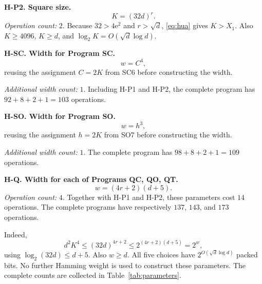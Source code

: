 \documentclass[11pt]{article}
\theoremstyle{remark}
\begin{document}
\textbf{H-P2. Square size.}
\[
  K=(32d)^r.
\]
\emph{Operation count:} $2$.
Because $32>4\mathrm e^2$ and $r>\sqrt d$,
\eqref{eq:hua} gives $K>X_1$.
Also $K\ge4096$, $K\ge d$, and $\log_2K=O(\sqrt d\log d)$.

\textbf{H-SC. Width for Program SC.}
\[
  w=C^4,
\]
reusing the assignment $C=2K$ from SC6 before constructing the width.

\emph{Additional width count:} $1$.
Including H-P1 and H-P2, the complete program has
$92+8+2+1=103$ operations.

\textbf{H-SO. Width for Program SO.}
\[
  w=h^3,
\]
reusing the assignment $h=2K$ from SO7 before constructing the width.

\emph{Additional width count:} $1$.
The complete program has $98+8+2+1=109$ operations.

\textbf{H-Q. Width for each of Programs QC, QO, QT.}
\[
  w=(4r+2)(d+5).
\]
\emph{Operation count:} $4$.
Together with H-P1 and H-P2, these parameters cost $14$ operations.
The complete programs have respectively $137$, $143$, and $173$ operations.

Indeed,
\[
  d^2K^4\le(32d)^{4r+2}
  \le2^{(4r+2)(d+5)}=2^w,
\]
using $\log_2(32d)\le d+5$. Also $w\ge d$.
All five choices have $2^{O(\sqrt d\log d)}$ packed bits.
No further Hamming weight is used to construct these parameters.
The complete counts are collected in Table~\ref{tab:parameters}.
\end{document}

